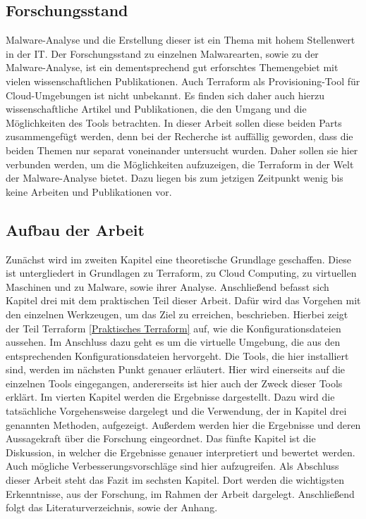 \subsection{Forschungsstand}
Malware-Analyse und die Erstellung dieser ist ein Thema mit hohem Stellenwert in der IT. Der Forschungsstand zu einzelnen Malwarearten, sowie zu der Malware-Analyse, ist ein dementsprechend gut erforschtes Themengebiet mit vielen wissenschaftlichen Publikationen. Auch \dq Terraform \dq{} als Provisioning-Tool für Cloud-Umgebungen ist nicht unbekannt. Es finden sich daher auch hierzu wissenschaftliche Artikel und Publikationen, die den Umgang und die Möglichkeiten des Tools betrachten. 
\newline
In dieser Arbeit sollen diese beiden Parts zusammengefügt werden, denn bei der Recherche ist auffällig geworden, dass die beiden Themen nur separat voneinander untersucht wurden. Daher sollen sie hier verbunden werden, um die Möglichkeiten aufzuzeigen, die Terraform in der Welt der Malware-Analyse bietet. Dazu liegen bis zum jetzigen Zeitpunkt wenig bis keine Arbeiten und Publikationen vor.
\subsection{Aufbau der Arbeit}
Zunächst wird im zweiten Kapitel eine theoretische Grundlage geschaffen. Diese ist untergliedert in Grundlagen zu \dq Terraform\dq, zu Cloud Computing, zu virtuellen Maschinen und zu Malware, sowie ihrer Analyse. 
\newline Anschließend befasst sich Kapitel drei mit dem praktischen Teil dieser Arbeit. Dafür wird das Vorgehen mit den einzelnen Werkzeugen, um das Ziel zu erreichen, beschrieben. Hierbei zeigt der Teil Terraform \ref{Praktisches Terraform} auf, wie die Konfigurationsdateien aussehen. Im Anschluss dazu geht es um die virtuelle Umgebung, die aus den entsprechenden Konfigurationsdateien hervorgeht. Die Tools, die hier installiert sind, werden im nächsten Punkt genauer erläutert. Hier wird einerseits auf die einzelnen Tools eingegangen, andererseits ist hier auch der Zweck dieser Tools erklärt.
\newline
Im vierten Kapitel werden die Ergebnisse dargestellt. Dazu wird die tatsächliche Vorgehensweise dargelegt und die Verwendung, der in Kapitel drei genannten Methoden, aufgezeigt. Außerdem werden hier die Ergebnisse und deren Aussagekraft über die Forschung eingeordnet. 
\newline
Das fünfte Kapitel ist die Diskussion, in welcher die Ergebnisse genauer interpretiert und bewertet werden. Auch mögliche Verbesserungsvorschläge sind hier aufzugreifen.
\newline
Als Abschluss dieser Arbeit steht das Fazit im sechsten Kapitel. Dort werden die wichtigsten Erkenntnisse, aus der Forschung, im Rahmen der Arbeit dargelegt. Anschließend folgt das Literaturverzeichnis, sowie der Anhang.
